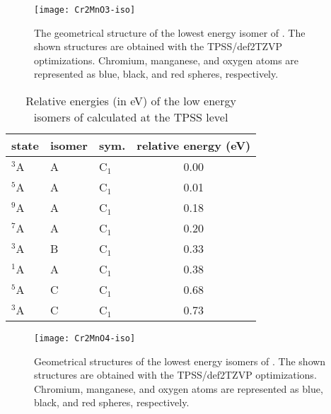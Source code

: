 \begin{figure}
	\centering
	\texttt{[image: Cr2MnO3-iso]}
	\caption{The geometrical structure of the lowest energy isomer of . The shown structures are obtained with the TPSS/def2TZVP optimizations. Chromium, manganese, and oxygen atoms are represented as blue, black, and red spheres, respectively.}
	\label{figs:CrMn2O8}
\end{figure}







\begin{table}[]
	\centering
	\caption{Relative energies (in eV) of the low energy isomers of  calculated at the TPSS level}
	\begin{tabular}{@{}lllc@{}}
	\toprule
	state & isomer & sym. & relative energy (eV) \\ \midrule
	$^3$A    & A      & C$_1$    & 0.00                 \\
	$^5$A    & A      & C$_1$    & 0.01                 \\
	$^9$A    & A      & C$_1$    & 0.18                 \\
	$^7$A    & A      & C$_1$    & 0.20                 \\
	$^3$A    & B      & C$_1$    & 0.33                 \\
	$^1$A    & A      & C$_1$    & 0.38                 \\
	$^5$A    & C      & C$_1$    & 0.68                 \\
	$^3$A    & C      & C$_1$    & 0.73                 \\ \bottomrule
	\end{tabular}
\end{table}

	

\begin{figure}
	\centering
	\texttt{[image: Cr2MnO4-iso]}
	\caption{Geometrical structures of the lowest energy isomers of . The shown structures are obtained with the TPSS/def2TZVP optimizations. Chromium, manganese, and oxygen atoms are represented as blue, black, and red spheres, respectively.}
	\label{figs:Cr2MnO4}
\end{figure}







